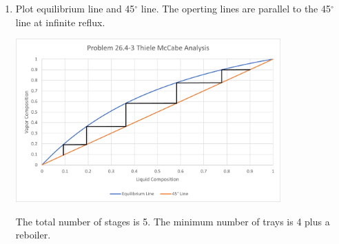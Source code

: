 \documentclass[12pt]{article}
\begin{document}
\begin{enumerate}
\begin{enumerate}
        \item 
        
        Plot equilibrium line and 45$^\circ$ line. The operting lines are parallel to the 45$^\circ$ line at infinite reflux. 

        \begin{center}
            \includegraphics[width=0.8\textwidth]{assets/p4.png}
        \end{center}

        The total number of stages is 5. The minimum number of trays is 4 plus a reboiler.
    \end{enumerate}
    
\end{enumerate}
\end{document}

